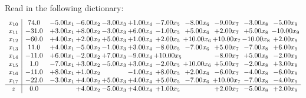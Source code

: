 \documentclass[9pt]{article}
\begin{document}
Read in the following dictionary:
\[\begin{array}{c| c c@{\hskip 2pt} c@{\hskip 2pt} c@{\hskip 2pt} c@{\hskip 2pt} c@{\hskip 2pt} c@{\hskip 2pt} c@{\hskip 2pt} c@{\hskip 2pt} c@{\hskip 2pt} }
 x_{10}   &  74.0 & -5.00 x_{1} & -6.00 x_{2} & -3.00 x_{3} & +  1.00 x_{4} & -7.00 x_{5} & -8.00 x_{6} & -9.00 x_{7} & -3.00 x_{8} & -5.00 x_{9}\\
 x_{11}   &  -31.0 & +  3.00 x_{1} & +  8.00 x_{2} & -3.00 x_{3} & +  6.00 x_{4} & -1.00 x_{5} & +  5.00 x_{6} & +  2.00 x_{7} & +  5.00 x_{8} & -10.00 x_{9}\\
 x_{12}   &  -60.0 & +  4.00 x_{1} & +  2.00 x_{2} & +  5.00 x_{3} & +  1.00 x_{4} & +  2.00 x_{5} & + 10.00 x_{6} & + 10.00 x_{7} & -10.00 x_{8} & +  2.00 x_{9}\\
 x_{13}   &  11.0 & +  4.00 x_{1} & -5.00 x_{2} & -1.00 x_{3} & +  3.00 x_{4} & -8.00 x_{5} & -7.00 x_{6} & +  5.00 x_{7} & -7.00 x_{8} & +  6.00 x_{9}\\
 x_{14}   &  -11.0 & +  6.00 x_{1} & -2.00 x_{2} & +  7.00 x_{3} & -9.00 x_{4} & + 10.00 x_{5} &   & -8.00 x_{7} & +  5.00 x_{8} & -2.00 x_{9}\\
 x_{15}   &  1.0 & -7.00 x_{1} & +  3.00 x_{2} & -5.00 x_{3} & +  3.00 x_{4} & -2.00 x_{5} & + 10.00 x_{6} & +  5.00 x_{7} & -2.00 x_{8} & +  3.00 x_{9}\\
 x_{16}   &  -11.0 & +  8.00 x_{1} & +  1.00 x_{2} &   & -1.00 x_{4} & +  8.00 x_{5} & +  2.00 x_{6} & -6.00 x_{7} & -4.00 x_{8} & -6.00 x_{9}\\
 x_{17}   &  -22.0 & -3.00 x_{1} & +  4.00 x_{2} & +  5.00 x_{3} & +  4.00 x_{4} & +  5.00 x_{5} & -7.00 x_{6} & + 10.00 x_{7} & -7.00 x_{8} & -4.00 x_{9}\\
\hline
z    &  0.0  &   & +  4.00 x_{2} & -5.00 x_{3} & +  4.00 x_{4} & +  1.00 x_{5} &   & +  2.00 x_{7} & -5.00 x_{8} & +  2.00 x_{9}\\
\end{array}\]
\end{document}
